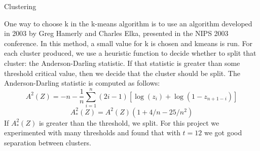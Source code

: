 \documentclass[final,t]{beamer}
\begin{document}
\begin{frame}{}
\begin{columns}[t]
    \begin{column}{.3\linewidth}
      \begin{block}{Clustering}
        \par
        One way to choose k in the k-means algorithm is to use an algorithm
developed in 2003 by Greg Hamerly and Charles Elka, presented in the NIPS
2003 conference. In this method, a small value for k is
chosen and kmeans is run. For each cluster produced, we use a
heuristic function to decide whether to split that cluster: the
Anderson-Darling statistic. If that statistic is greater than
some threshold critical value, then we decide that the cluster should be
split. The Anderson-Darling statistic is computed as follows:
$$
A^2(Z) = -n - \frac{1}{n}\sum_{i=1}^n (2i -
1)[\log(z_i)+\log(1-z_{n+1-i})]
$$$$
A^2_*(Z) = A^2(Z)(1 + 4/n - 25/n^2)
$$
If $A^2_*(Z)$ is greater than the threshold, we split. For this
project we experimented with many thresholds and found that with $t=12$ we
got good separation between clusters.


\end{block}
\end{column}
\end{columns}
\end{frame}
\end{document}
